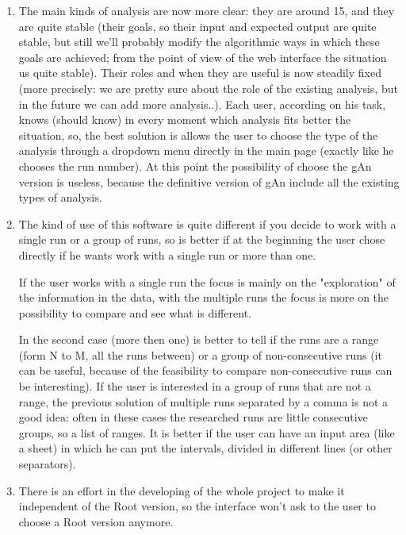 \begin{enumerate}
\item 
The main kinds of analysis are now more clear: they are around 15, and they are     quite stable (their goals, so their input and expected output are quite stable, but still we'll probably modify the algorithmic ways in which these goals are achieved; from the point of view of the web interface the situation us quite stable). Their roles and when they are useful is now steadily fixed (more precisely: we are pretty sure about the role of the existing analysis, but in the future we can add more analysis..). Each user, according on his task, knows (should know) in every moment which analysis fits better the situation, so, the best solution is allows the user to choose the type of the analysis through a dropdown menu directly in the main page (exactly like he chooses the run number). At this point the possibility of choose the gAn version is useless, because the definitive version of gAn include all the existing types of analysis. 

\item 
The kind of use of this software is quite different if you decide to work with a single run or a group of runs, so is better if at the beginning the user chose directly if he wants work with a single run or more than one. 

If the user works with a single run the focus is mainly on the "exploration" of the information in the data, with the multiple runs the focus is more on the possibility to compare and see what is different.

In the second case (more then one) is better to tell if the runs are a range (form N to M, all the runs between) or a group of non-consecutive runs (it can be useful, because of the feasibility to compare non-consecutive runs can be interesting). If the user is interested in a group of runs that are not a range, the previous solution of multiple runs separated by a comma is not a good idea: often in these cases the researched runs are little consecutive groups, so a list of ranges. It is better if the user can have an input area (like a sheet) in which he can put the intervals, divided in different lines (or other separators).

\item
There is an effort in the developing of the whole project to make it independent of the Root version, so the interface won't ask to the user to choose a Root version anymore. 

\end{enumerate}
 
